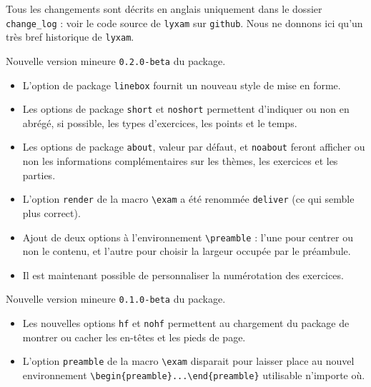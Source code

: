 \documentclass[12pt,a4paper]{scrartcl}
\theoremstyle{definition}
\begin{document}
Tous les changements sont décrits en anglais uniquement dans le dossier \verb+change_log+ : voir le code source de \verb+lyxam+ sur \verb+github+. Nous ne donnons ici qu'un très bref historique de \verb+lyxam+.

\begin{description}[leftmargin=1em]
    \setlength\itemsep{1em}

    \item[2017-11-28] Nouvelle version mineure \verb+0.2.0-beta+ du package.
    \begin{itemize}
        \item L'option de package \verb+linebox+ fournit un nouveau style de mise en forme.

        \item Les options de package \verb+short+ et \verb+noshort+ permettent d'indiquer ou non en abrégé, si possible, les types d'exercices, les points et le temps.

        \item Les options de package \verb+about+, valeur par défaut, et \verb+noabout+ feront afficher ou non les informations complémentaires sur les thèmes, les exercices et les parties.

        \item L'option \verb+render+ de la macro \verb+\exam+ a été renommée \verb+deliver+ (ce qui semble plus correct).

        \item Ajout de deux options à l'environnement \verb+\preamble+ : l'une pour centrer ou non le contenu, et l'autre pour choisir la largeur occupée par le préambule.

        \item Il est maintenant possible de personnaliser la numérotation des exercices.
    \end{itemize}

    \item[2017-11-12] Nouvelle version mineure \verb+0.1.0-beta+ du package.
    \begin{itemize}
        \item Les nouvelles options \verb+hf+ et \verb+nohf+ permettent au chargement du package de montrer ou cacher les en-têtes et les pieds de page.

        \item L'option \verb+preamble+ de la macro \verb+\exam+ disparait pour laisser place au nouvel environnement \verb+\begin{preamble}...\end{preamble}+ utilisable n'importe où.


\end{itemize}
\end{description}
\end{document}
